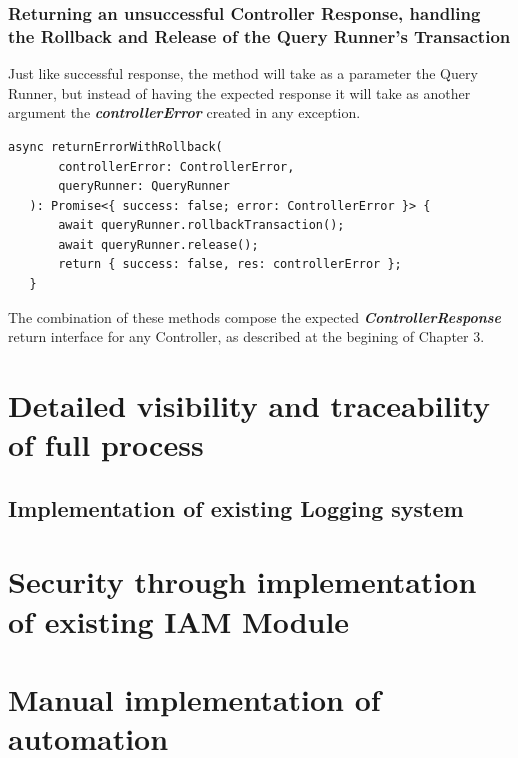 \subsubsection{Returning an unsuccessful Controller Response, handling the Rollback and Release of the Query Runner's Transaction}


Just like successful response, the method will take as a parameter the Query Runner, but instead of having the expected response it will take as another argument the \textbf{\textit{controllerError}} created in any exception.

\begin{verbatim}
async returnErrorWithRollback(
       controllerError: ControllerError,
       queryRunner: QueryRunner
   ): Promise<{ success: false; error: ControllerError }> {
       await queryRunner.rollbackTransaction();
       await queryRunner.release();
       return { success: false, res: controllerError };
   }
\end{verbatim}

The combination of these methods compose the expected \textbf{\textit{ControllerResponse}} return interface for any Controller, as described at the begining of Chapter 3.

\section{Detailed visibility and traceability of full process}

\subsection{Implementation of existing Logging system}

\section{Security through implementation of existing IAM Module}

\section{Manual implementation of automation}
